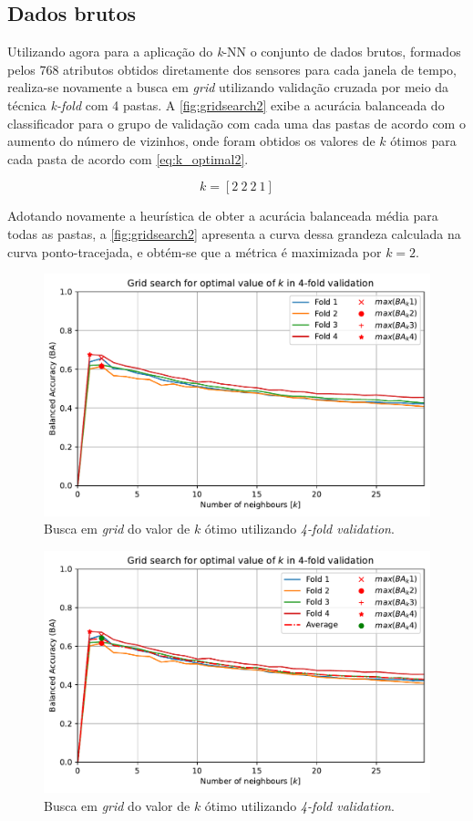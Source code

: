 \subsection{Dados brutos}

Utilizando agora para a aplicação do \textit{k}-NN o conjunto de dados brutos, formados pelos 768 atributos obtidos diretamente dos sensores para cada janela de tempo, realiza-se novamente a busca em \textit{grid} utilizando validação cruzada por meio da técnica \textit{k-fold} com 4 pastas. A \autoref{fig:gridsearch2} exibe a acurácia balanceada do classificador para o grupo de validação com cada uma das pastas de acordo com o aumento do número de vizinhos, onde foram obtidos os valores de $k$ ótimos para cada pasta de acordo com \eqref{eq:k_optimal2}.

\begin{equation}\label{eq:k_optimal2}
	k = [2\ 2\ 2\ 1]
\end{equation}

Adotando novamente a heurística de obter a acurácia balanceada média para todas as pastas, a \autoref{fig:gridsearch2} apresenta a curva dessa grandeza calculada na curva ponto-tracejada, e obtém-se que a métrica é maximizada por $k = 2$.


\begin{figure}[H]
	\centering
	\includegraphics[width=0.75\linewidth]{../../plot/knn_2/grid_search_k_fold}
	\caption{Busca em \textit{grid} do valor de $k$ ótimo utilizando \textit{4-fold validation}.}
	\label{fig:gridsearch2}
\end{figure}

\begin{figure}[H]
	\centering
	\includegraphics[width=0.75\linewidth]{../../plot/knn_2/grid_search_k_fold-k_optimal}
	\caption{Busca em \textit{grid} do valor de $k$ ótimo utilizando \textit{4-fold validation}.}
	\label{fig:gridsearch-k_optimal2}
\end{figure}

